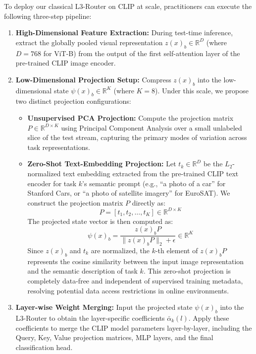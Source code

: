 To deploy our classical L3-Router on CLIP at scale, practitioners can execute the following three-step pipeline:
\begin{enumerate}
    \item \textbf{High-Dimensional Feature Extraction:} During test-time inference, extract the globally pooled visual representation $z(x)_b \in \mathbb{R}^D$ (where $D=768$ for ViT-B) from the output of the first self-attention layer of the pre-trained CLIP image encoder.
    \item \textbf{Low-Dimensional Projection Setup:} Compress $z(x)_b$ into the low-dimensional state $\psi(x)_b \in \mathbb{R}^K$ (where $K=8$). Under this scale, we propose two distinct projection configurations:
    \begin{itemize}
        \item \textbf{Unsupervised PCA Projection:} Compute the projection matrix $P \in \mathbb{R}^{D \times K}$ using Principal Component Analysis over a small unlabeled slice of the test stream, capturing the primary modes of variation across task representations.
        \item \textbf{Zero-Shot Text-Embedding Projection:} Let $t_k \in \mathbb{R}^D$ be the $L_2$-normalized text embedding extracted from the pre-trained CLIP text encoder for task $k$'s semantic prompt (e.g., ``a photo of a car'' for Stanford Cars, or ``a photo of satellite imagery'' for EuroSAT). We construct the projection matrix $P$ directly as:
        \begin{equation}
            P = \left[ t_1, t_2, \dots, t_K \right] \in \mathbb{R}^{D \times K}
        \end{equation}
        The projected state vector is then computed as:
        \begin{equation}
            \psi(x)_b = \frac{z(x)_b P}{\|z(x)_b P\|_2 + \epsilon} \in \mathbb{R}^K
        \end{equation}
        Since $z(x)_b$ and $t_k$ are normalized, the $k$-th element of $z(x)_b P$ represents the cosine similarity between the input image representation and the semantic description of task $k$. This zero-shot projection is completely data-free and independent of supervised training metadata, resolving potential data access restrictions in online environments.
    \end{itemize}
    \item \textbf{Layer-wise Weight Merging:} Input the projected state $\psi(x)_b$ into the L3-Router to obtain the layer-specific coefficients $\bar{\alpha}_k(l)$. Apply these coefficients to merge the CLIP model parameters layer-by-layer, including the Query, Key, Value projection matrices, MLP layers, and the final classification head.
\end{enumerate}

